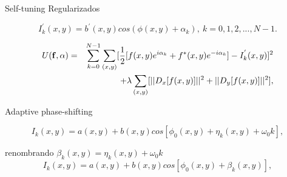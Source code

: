 \documentclass[]{beamer}
\begin{document}
\begin{frame}{Self-tuning Regularizados}
\begin{center}

\begin{equation}
I_{k}^{'}(x,y)=b^{'}(x,y)cos(\phi(x,y)+\alpha_{k}),\: k=0,1,2,...,N-1.
\end{equation}

\begin{eqnarray}
U(\bf{f,\alpha}) & = &\sum_{k=0}^{N-1}
\sum_{(x,y)}[\frac{1}{2}[f(x,y)e^{i\alpha_{k}}+f^{*}(x,y)e^{-i\alpha_{k}}]-I_{k}
^{'}(x,y)]^{2}\label{eq:U}\nonumber \\
 &  & +\lambda\sum_{(x,y)}[||D_{x}[f(x,y)]||^{2}+||D_{y}[f(x,y)]||^{2}],\nonumber 
\end{eqnarray}

\end{center}
\end{frame}
\begin{frame}{Adaptive phase-shifting}
\begin{center}

\begin{equation}
  I_k(x,y) = a(x,y)+b(x,y)cos[\phi_0(x,y) + \eta_k(x,y) + \omega_0 k],
\end{equation}

renombrando $\beta_k(x,y) = \eta_k(x,y) + \omega_0 k$
\begin{equation}
  I_k(x,y) = a(x,y)+b(x,y)cos[\phi_0(x,y) + \beta_k(x,y)],
\end{equation}


\end{center}
\end{frame}
\end{document}
